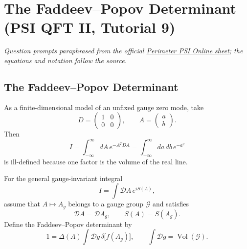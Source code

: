 \section{The Faddeev--Popov Determinant (PSI QFT II, Tutorial 9)}

\noindent\textit{Question prompts paraphrased from the official
\href{https://psi-online.perimeterinstitute.ca/courses/take/quantum-field-theory-ii-student/pdfs/20776413-module-8-tutorial}{Perimeter PSI Online sheet};
the equations and notation follow the source.}

\subsection{The Faddeev--Popov Determinant}

As a finite-dimensional model of an unfixed gauge zero mode, take
\begin{equation}
    D=\begin{pmatrix}1&0\\0&0\end{pmatrix},
    \qquad
    A=\begin{pmatrix}a\\b\end{pmatrix}.
\end{equation}
Then
\begin{equation}
    I=\int_{-\infty}^{\infty}dA\,e^{-A^TDA}
    =\int_{-\infty}^{\infty}da\,db\,e^{-a^2}
\end{equation}
is ill-defined because one factor is the volume of the real line.

For the general gauge-invariant integral
\begin{equation}
    I=\int\mathcal{D}A\,e^{iS(A)},
\end{equation}
assume that $A\mapsto A_g$ belongs to a gauge group $\mathcal{G}$ and satisfies
\begin{equation}
    \mathcal{D}A=\mathcal{D}A_g,
    \qquad
    S(A)=S(A_g).
\end{equation}
Define the Faddeev--Popov determinant by
\begin{equation}
    1=\Delta(A)\int\mathcal{D}g\,
        \delta\!\bigl[f(A_g)\bigr],
    \qquad
    \int\mathcal{D}g=\operatorname{Vol}(\mathcal{G}).
\end{equation}

